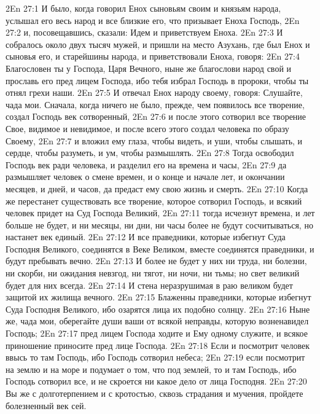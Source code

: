 \vs 2En 27:1
И было, когда говорил Енох сыновьям своим и князьям народа, услышал его весь народ и все близкие его, что призывает Еноха Господь,
\vs 2En 27:2
и, посовещавшись, сказали: Идем и приветствуем Еноха.
\vs 2En 27:3
И собралось около двух тысяч мужей, и пришли на место Азухань, где был Енох и сыновья его, и старейшины народа, и приветствовали Еноха, говоря:
\vs 2En 27:4
Благословен ты у Господа, Царя Вечного, ныне же благослови народ свой и прославь его пред лицем Господа, ибо тебя избрал Господь в пророки, чтобы ты отнял грехи наши.
\vs 2En 27:5
И отвечал Енох народу своему, говоря: Слушайте, чада мои. Сначала, когда ничего не было, прежде, чем появилось все творение, создал Господь век сотворенный,
\vs 2En 27:6
и после этого сотворил все творение Свое, видимое и невидимое, и после всего этого создал человека по образу Своему,
\vs 2En 27:7
и вложил ему глаза, чтобы видеть, и уши, чтобы слышать, и сердце, чтобы разуметь, и ум, чтобы размышлять.
\vs 2En 27:8
Тогда освободил Господь век ради человека, и разделил его на времена и часы,
\vs 2En 27:9
да размышляет человек о смене времен, и о конце и начале лет, и окончании месяцев, и дней, и часов, да предаст ему свою жизнь и смерть.
\vs 2En 27:10
Когда же перестанет существовать все творение, которое сотворил Господь, и всякий человек придет на Суд Господа Великий,
\vs 2En 27:11
тогда исчезнут времена, и лет больше не будет, и ни месяцы, ни дни, ни часы более не будут сосчитываться, но настанет век единый.
\vs 2En 27:12
И все праведники, которые избегнут Суда Господня Великого, соединятся в Веке Великом, вместе соединятся праведники, и будут пребывать вечно.
\vs 2En 27:13
И более не будет у них ни труда, ни болезни, ни скорби, ни ожидания невзгод, ни тягот, ни ночи, ни тьмы; но свет великий будет для них всегда.
\vs 2En 27:14
И стена неразрушимая в раю великом будет защитой их жилища вечного.
\vs 2En 27:15
Блаженны праведники, которые избегнут Суда Господня Великого, ибо озарятся лица их подобно солнцу.
\vs 2En 27:16
Ныне же, чада мои, оберегайте души ваши от всякой неправды, которую возненавидел Господь;
\vs 2En 27:17
пред лицем Господа ходите и Ему одному служите, и всякое приношение приносите пред лице Господа.
\vs 2En 27:18
Если и посмотрит человек ввысь то там Господь, ибо Господь сотворил небеса;
\vs 2En 27:19
если посмотрит на землю и на море и подумает о том, что под землей, то и там Господь, ибо Господь сотворил все, и не скроется ни какое дело от лица Господня.
\vs 2En 27:20
Вы же с долготерпением и с кротостью, сквозь страдания и мучения, пройдете болезненный век сей.

